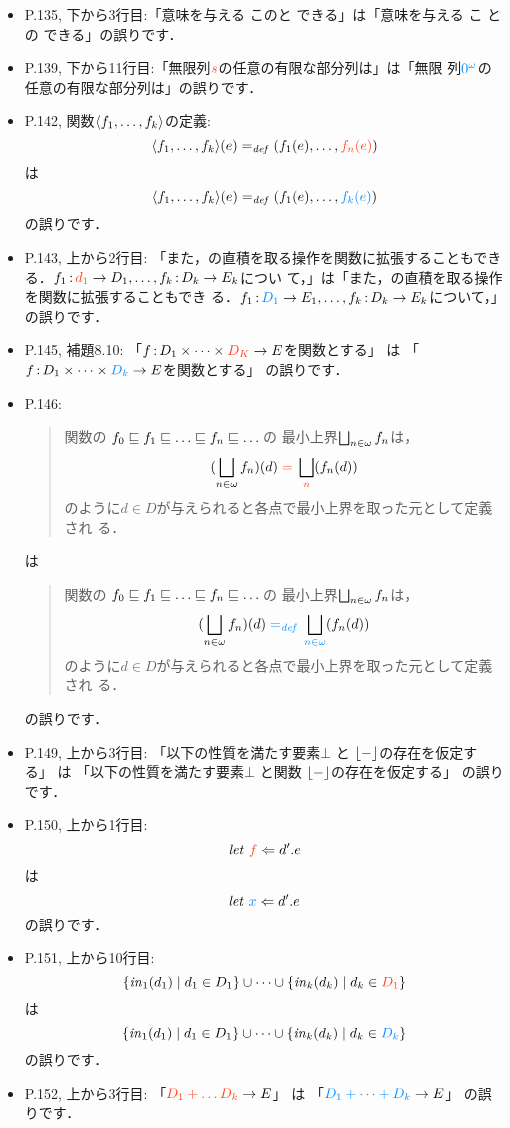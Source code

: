 \documentclass[12pt,titlepage,twoside,openright,dvipdfmx]{jsbook}
\newcommand\old[1]{%
  \textcolor[rgb]{1.0,0.25,0.1}{#1}%
  }
\newcommand\new[1]{%
  \textcolor[rgb]{0,0.55,1.0}{#1}%
  }
\theoremstyle{definition}
\begin{document}
\begin{itemize}
\item P.135, 下から3行目:「意味を与える\old{このと}できる」は「意味を与える\new{こ
  との}できる」の誤りです．
\item P.139,
  下から11行目:「無限列$\old{s}$の任意の有限な部分列は」は「無限
  列$\new{0^\omega}$の任意の有限な部分列は」の誤りです．
\item P.142, 関数$\langle{f_1,\dots,f_k}\rangle$の定義:
  \[
    \tuple{f_1,\dots,f_k}(e) =_{\mathit{def}} (f_1(e),\dots,\old{f_n(e)})
  \]
  は
  \[
    \tuple{f_1,\dots,f_k}(e) =_{\mathit{def}} (f_1(e),\dots,\new{f_k(e)})
  \]
  の誤りです．
\item P.143, 上から2行目:
  「また，\cpo{}の直積を取る操作を関数に拡張することもできる．$f_1
  \COL \old{d_1} \rightarrow D_1,\dots,f_k \COL D_k \rightarrow E_k$につい
  て，」は「また，\cpo{}の直積を取る操作を関数に拡張することもでき
  る．$f_1 \COL \new{D_1} \rightarrow E_1, \dots,f_k \COL D_k \rightarrow
  E_k$について，」の誤りです．
\item P.145, 補題8.10:
  「$f \COL D_1 \times \dots \times \old{D_K} \rightarrow E$を関数とする」
  は
  「$f \COL D_1 \times \dots \times \new{D_k} \rightarrow E$を関数とする」
  の誤りです．
\item P.146:
  \begin{quote}
    関数の \omegachain $f_0 \sqle f_1 \sqle \dots \sqle f_n \sqle \dots$の
    最小上界$\bigsqcup_{n \in \omega} f_n$は，
    \[
      (\bigsqcup_{n \in \NAT} f_n)(d) \old{{}={}} \bigsqcup_{\old{n}}(f_n(d))
    \]
    のように$d \in D$が与えられると各点で最小上界を取った元として定義され
    る．
  \end{quote}
  は
  \begin{quote}
    関数の \omegachain $f_0 \sqle f_1 \sqle \dots \sqle f_n \sqle \dots$の
    最小上界$\bigsqcup_{n \in \omega} f_n$は，
    \[
      (\bigsqcup_{n \in \NAT} f_n)(d) \new{{}=_{\mathit{def}}{}} \bigsqcup_{\new{n \in \NAT}}(f_n(d))
    \]
    のように$d \in D$が与えられると各点で最小上界を取った元として定義され
    る．
  \end{quote}
  の誤りです．
\item P.149, 上から3行目:
  「以下の性質を満たす要素$\bot$\old{と}$\lfloor - \rfloor$の存在を仮定する」
  は
  「以下の性質を満たす要素$\bot$\new{と関数}$\lfloor - \rfloor$の存在を仮定する」
  の誤りです．
\item P.150, 上から1行目:
  \[
    \METALET\ \old{f} \Leftarrow d'. e
  \]
  は
  \[
    \METALET\ \new{x} \Leftarrow d'. e
  \]
  の誤りです．
\item P.151, 上から10行目:
  \[
    \set{\INJ_1(d_1) \mid d_1 \in D_1} \cup \dots \cup \set{\INJ_k(d_k) \mid d_k \in \old{D_1}}
  \]
  は
  \[
    \set{\INJ_1(d_1) \mid d_1 \in D_1} \cup \dots \cup \set{\INJ_k(d_k) \mid d_k \in \new{D_k}}
  \]
  の誤りです．
\item P.152, 上から3行目:
  「$\old{D_1 + \dots D_k} \rightarrow E$」
  は
  「$\new{D_1 + \dots + D_k} \rightarrow E$」
  の誤りです．
\end{itemize}
\end{document}
